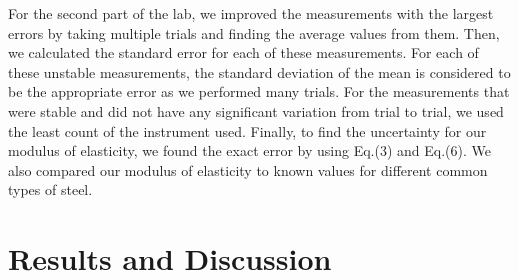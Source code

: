 \documentclass[leqno]{article}
\begin{document}
For the second part of the lab, we improved the measurements with the largest errors by taking multiple trials and finding the average values from them.  Then, we calculated the standard error for each of these measurements.  For each of these unstable measurements, the standard deviation of the mean is considered to be the appropriate error as we performed many trials.  For the measurements that were stable and did not have any significant variation from trial to trial, we used the least count of the instrument used.  Finally, to find the uncertainty for our modulus of elasticity, we found the exact error by using Eq.(3) and Eq.(6).  We also compared our modulus of elasticity to known values for different common types of steel. 
\section*{Results and Discussion}
\end{document}
